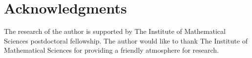 \documentclass[12pt,reqno]{amsart}
\begin{document}
\section*{Acknowledgments}
The research of the author is supported by The Institute of Mathematical Sciences postdoctoral fellowship.
The author would like to thank The Institute of Mathematical Sciences for providing a friendly atmosphere for research.













 
 
\end{document}
